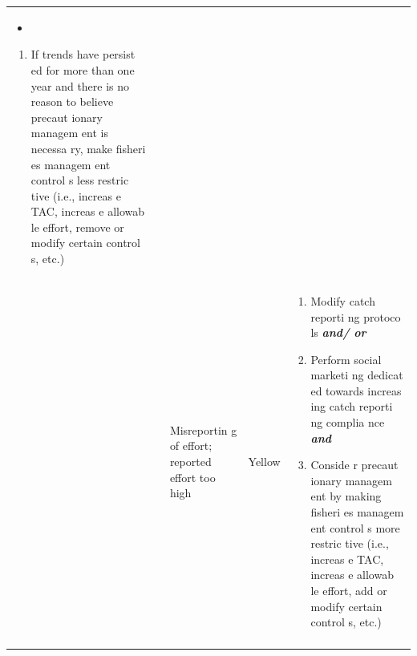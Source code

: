 \documentclass[]{book}
\providecommand{\tightlist}{%
  \setlength{\itemsep}{0pt}\setlength{\parskip}{0pt}}
\begin{document}
\begin{longtable}[]{@{}lllll@{}}
\begin{minipage}[t]{0.19\columnwidth}
\begin{itemize}
\item
\end{itemize}

\begin{enumerate}
\def\labelenumi{\arabic{enumi}.}
\setcounter{enumi}{1}
\tightlist
\item
  If trends have persist ed for more than one year and there is no
  reason to believe precaut ionary managem ent is necessa ry, make
  fisheri es managem ent control s less restric tive (i.e., increas e
  TAC, increas e allowab le effort, remove or modify certain control s,
  etc.)
\end{enumerate}\strut
\end{minipage}\tabularnewline
\begin{minipage}[t]{0.19\columnwidth}\raggedright\strut
\strut
\end{minipage} & \begin{minipage}[t]{0.19\columnwidth}\raggedright\strut
\strut
\end{minipage} & \begin{minipage}[t]{0.19\columnwidth}\raggedright\strut
Misreportin g of effort; reported effort too high\strut
\end{minipage} & \begin{minipage}[t]{0.19\columnwidth}\raggedright\strut
Yellow\strut
\end{minipage} & \begin{minipage}[t]{0.19\columnwidth}\raggedright\strut
\begin{enumerate}
\def\labelenumi{\arabic{enumi}.}
\item
  Modify catch reporti ng protoco ls \textbf{\emph{and/ or}}
\item
  Perform social marketi ng dedicat ed towards increas ing catch reporti
  ng complia nce \textbf{\emph{and} }
\item
  Conside r precaut ionary managem ent by making fisheri es managem ent
  control s more restric tive (i.e., increas e TAC, increas e allowab le
  effort, add or modify certain control s, etc.)
\end{enumerate}\strut
\end{minipage}\tabularnewline
\begin{minipage}[t]{0.19\columnwidth}\raggedright\strut
\strut
\end{minipage} & \begin{minipage}[t]{0.19\columnwidth}\raggedright\strut
\strut
\end{minipage} & \begin{minipage}[t]{0.19\columnwidth}\raggedright\strut

\end{minipage}
\end{longtable}
\end{document}
